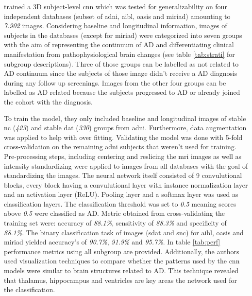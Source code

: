 
\textcite{yeeConstructionMRIBasedAlzheimer2021} trained a 3D subject-level \gls{cnn} which was tested for generalizability on four independent databases (subset of \gls{adni}, \gls{aibl}, \gls{oasis} and \gls{miriad}) amounting to \textit{7.902} images. Considering baseline and longitudinal information, images of subjects in the databases (except for \gls{miriad}) were categorized into seven groups with the aim of representing the continuum of \gls{AD} and differentiating clinical manifestation from pathophysiological brain changes (see table \ref{tab:strati} for subgroup descriptions). Three of those groups can be labelled as not related to \gls{AD} continuum since the subjects of those image didn't receive a \gls{AD} diagnosis during any follow up screenings. Images from the other four groups can be labelled as \gls{AD} related because the subjects progressed to \gls{AD} or already joined the cohort with the diagnosis.  



To train the model, they only included baseline and longitudinal images of stable \gls{nc} (\textit{423}) and stable \gls{dat} (\textit{330}) groups from \gls{adni}. Furthermore, data augmentation was applied to help with over fitting. Validating the model was done with 5-fold cross-validation on the remaining \gls{adni} subjects that weren't used for training. Pre-processing steps, including centering and reslicing the \gls{mri} images as well as intensity standardizing were applied to images from all databases with the goal of standardizing the images. The neural network itself consisted of 9 convulutional blocks, every block having a convulutional layer with instance normalization layer and an activation layer (ReLU). Pooling layer and a softmax layer was used as classification layers. The classification threshold was set to \textit{0.5} meaning scores above \textit{0.5} were classified as \gls{AD}. Metric obtained from cross-validating the training set were: accuracy of \textit{88.1\%}, sensitivity of \textit{88.3\%} and specificity of \textit{88.1\%}. The binary classification task of images (s\gls{dat} and s\gls{nc}) for \gls{aibl}, \gls{oasis} and \gls{miriad} yielded accuracy's of \textit{90.7\%}, \textit{91.9\%} and \textit{95.7\%}. In table \ref{tab:perf} performance metrics using all subgroup are provided.  Additionally, the authors used visualization techniques to compare whether the patterns used by the \gls{cnn} models were similar to brain structures related to \gls{AD}. This technique revealed that thalamus, hippocampus and ventricles are key areas the network used for the classification.



